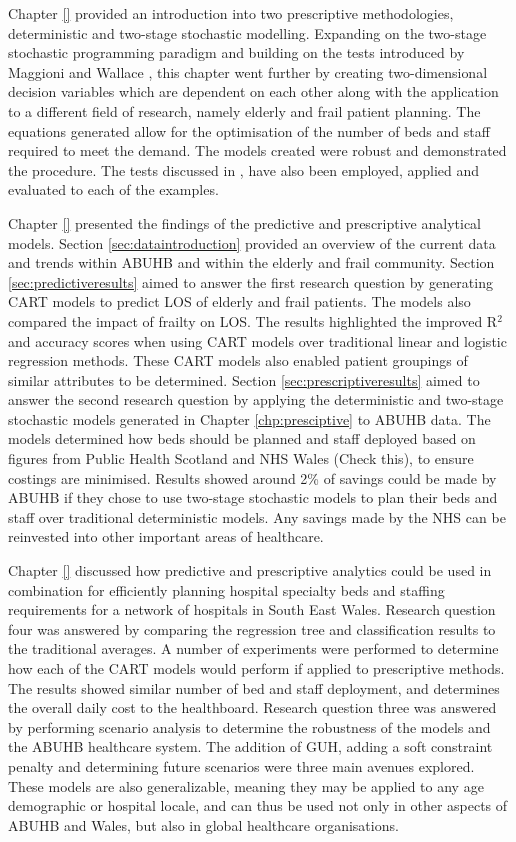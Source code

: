 \documentclass[../thesis.tex]{subfiles}
\begin{document}
Chapter \ref{} provided an introduction into two prescriptive methodologies, deterministic and two-stage stochastic modelling. Expanding on the two-stage stochastic programming paradigm and building on the tests introduced by Maggioni and Wallace \cite{Maggioni2010}, this chapter went further by creating two-dimensional decision variables which are dependent on each other along with the application to a different field of research, namely elderly and frail patient planning. The equations generated allow for the optimisation of the number of beds and staff required to meet the demand. The models created were robust and demonstrated the procedure. The tests discussed in \cite{Maggioni2010}, have also been employed, applied and evaluated to each of the examples. 


Chapter \ref{} presented the findings of the predictive and prescriptive analytical models. Section \ref{sec:dataintroduction} provided an overview of the current data and trends within ABUHB and within the elderly and frail community. Section \ref{sec:predictiveresults} aimed to answer the first research question by generating CART models to predict LOS of elderly and frail patients. The models also compared the impact of frailty on LOS. The results highlighted the improved R$^{2}$ and accuracy scores when using CART models over traditional linear and logistic regression methods. These CART models also enabled patient groupings of similar attributes to be determined. Section \ref{sec:prescriptiveresults} aimed to answer the second research question by applying the deterministic and two-stage stochastic models generated in Chapter \ref{chp:presciptive} to ABUHB data. The models determined how beds should be planned and staff deployed based on figures from Public Health Scotland and NHS Wales (Check this), to ensure costings are minimised. Results showed around 2\% of savings could be made by ABUHB if they chose to use two-stage stochastic models to plan their beds and staff over traditional deterministic models. Any savings made by the NHS can be reinvested into other important areas of healthcare.

Chapter \ref{} discussed how predictive and prescriptive analytics could be used in combination for efficiently planning hospital specialty beds and staffing requirements for a network of hospitals in South East Wales. Research question four was answered by comparing the regression tree and classification results to the traditional averages. A number of experiments were performed to determine how each of the CART models would perform if applied to prescriptive methods. The results showed similar number of bed and staff deployment, and determines the overall daily cost to the healthboard. Research question three was answered by performing scenario analysis to determine the robustness of the models and the ABUHB healthcare system. The addition of GUH, adding a soft constraint penalty and determining future scenarios were three main avenues explored. These models are also generalizable, meaning they may be applied to any age demographic or hospital locale, and can thus be used not only in other aspects of ABUHB and Wales, but also in global healthcare organisations.
\end{document}
